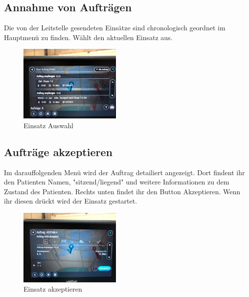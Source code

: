 \documentclass[a4paper,12pt]{scrartcl}
\begin{document}
    \subsection{Annahme von Aufträgen}
    Die von der Leitstelle gesendeten Einsätze sind chronologisch geordnet im Hauptmenü zu finden.
    Wählt den aktuellen Einsatz aus.
    \begin{figure}[h]
        \begin{center}
            \includegraphics[width=5cm]{bilder/annahme.jpg}
            \caption{Einsatz Auswahl}
            \label{Auswahl}
        \end{center}
    \end{figure}
    
    \newpage
    \subsection{Aufträge akzeptieren}
    Im darauffolgenden Menü wird der Auftrag detailiert angezeigt. Dort findent ihr den Patienten Namen, "sitzend/liegend" und
    weitere Informationen zu dem Zustand des Patienten. Rechts unten findet ihr den Button Akzeptieren. Wenn ihr diesen drückt wird der Einsatz gestartet.
    \begin{figure}[h]
        \begin{center}
            \includegraphics[width=5cm]{bilder/akzeptieren.jpg}
            \caption{Einsatz akzeptieren}
            \label{akzeptieren}
        \end{center}     
    \end{figure}
\end{document}
